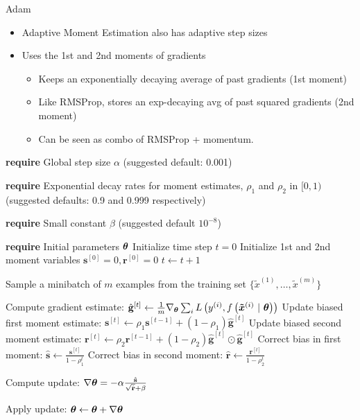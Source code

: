 \documentclass[11pt,compress,t,notes=noshow, xcolor=table]{beamer}
\begin{document}
\begin{vbframe}{Adam}
	\begin{itemize}
		\item Adaptive Moment Estimation also has adaptive step sizes
		\item Uses the 1st and 2nd moments of gradients
		\begin{itemize}
			\item Keeps an exponentially decaying average of past gradients (1st moment)
			\item Like RMSProp, stores an exp-decaying avg of past squared gradients (2nd moment)
			\item Can be seen as combo of RMSProp + momentum.
		\end{itemize}
	\end{itemize}
	
	
	\framebreak
	
	\begin{algorithm}[H]
		\scriptsize 
		\caption{Adam}
		\begin{algorithmic}[1]
			\State \textbf{require} Global step size $\alpha$ (suggested default: 0.001) \strut
			\State \parbox[t]{\dimexpr\linewidth-\algorithmicindent}{\textbf{require} Exponential decay rates for moment estimates, $\rho_1$ and $\rho_2$ in $[0,1)$ (suggested defaults: 0.9 and 0.999 respectively)} \strut
			\State \parbox[t]{\dimexpr\linewidth-\algorithmicindent}{\textbf{require} Small constant $\beta$ (suggested default $10^{-8}$) \strut}
			\State \textbf{require} Initial parameters $\bm{\theta}$ 
			\State Initialize time step $t = 0$
			\State Initialize 1st and 2nd moment variables $\mathbf{s}^{[0]} = 0, \mathbf{r}^{[0]} = 0$
			\State $t \leftarrow t + 1$
			\State \parbox[t]{\dimexpr\linewidth-\algorithmicindent}{Sample a minibatch of $m$ examples from the training set $\{\tilde{x}^{(1)},\dots,\tilde{x}^{(m)}\}$ \strut}
			\State Compute gradient estimate: $\hat{\mathbf{g}}^{[t]} \leftarrow \frac{1}{m} \nabla_{\bm{\theta}} \sum_{i} L\left(y^{(i)}, f\left(\bm{\tilde{x}}^{(i)} ~|~ \bm{\theta}\right)\right)$
			\State Update biased first moment estimate: $\mathbf{s}^{[t]} \leftarrow \rho_1 \mathbf{s}^{[t-1]}  + (1 - \rho_1) \hat{\mathbf{g}}^{[t]}$
			\State Update biased second moment estimate: $\mathbf{r}^{[t]} \leftarrow \rho_2 \mathbf{r}^{[t-1]}  + (1 - \rho_2) \hat{\mathbf{g}}^{[t]} \odot \hat{\mathbf{g}}^{[t]}$
			\State Correct bias in first moment: $\hat{\mathbf{s}} \leftarrow \frac{\mathbf{s}^{[t]} }{1-\rho_1^t}$
			\State Correct bias in second moment: $\hat{\mathbf{r}} \leftarrow \frac{\mathbf{r}^{[t]} }{1-\rho_2^t}$
			\State \parbox[t]{\dimexpr\linewidth-\algorithmicindent}{Compute update: $\nabla\bm{\theta} = - \alpha \frac{\hat{\mathbf{s}}}{\sqrt{\hat{\mathbf{r}}} + \beta}$ \strut}
			\State Apply update: $\bm{\theta} \leftarrow \bm{\theta} + \nabla\bm{\theta}$
			

\end{algorithmic}
\end{algorithm}
\end{vbframe}
\end{document}
